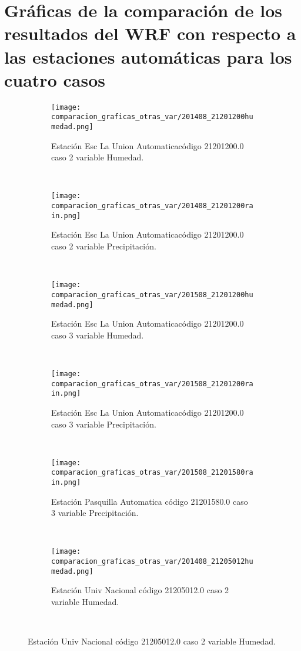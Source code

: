 \chapter{Gráficas de la comparación de los resultados del WRF con respecto a las estaciones automáticas para los cuatro casos}



\label{anexo:graficas_otras_variables_wrf}


\begin{figure}
    
\begin{subfigure}[normla]{0.4\textwidth}
\caption{Estación Esc La Union Automaticacódigo 21201200.0 caso 2 variable Humedad.}
\texttt{[image: comparacion\_graficas\_otras\_var/201408\_21201200humedad.png]}
\end{subfigure}
~
\begin{subfigure}[normla]{0.4\textwidth}
\caption{Estación Esc La Union Automaticacódigo 21201200.0 caso 2 variable Precipitación.}
\texttt{[image: comparacion\_graficas\_otras\_var/201408\_21201200rain.png]}
\end{subfigure}
~
\begin{subfigure}[normla]{0.4\textwidth}
\caption{Estación Esc La Union Automaticacódigo 21201200.0 caso 3 variable Humedad.}
\texttt{[image: comparacion\_graficas\_otras\_var/201508\_21201200humedad.png]}
\end{subfigure}
~
\begin{subfigure}[normla]{0.4\textwidth}
\caption{Estación Esc La Union Automaticacódigo 21201200.0 caso 3 variable Precipitación.}
\texttt{[image: comparacion\_graficas\_otras\_var/201508\_21201200rain.png]}
\end{subfigure}
~
\begin{subfigure}[normla]{0.4\textwidth}
\caption{Estación Pasquilla Automatica código 21201580.0 caso 3 variable Precipitación.}
\texttt{[image: comparacion\_graficas\_otras\_var/201508\_21201580rain.png]}
\end{subfigure}
~
\begin{subfigure}[normla]{0.4\textwidth}
\caption{Estación Univ Nacional código 21205012.0 caso 2 variable Humedad.}
\texttt{[image: comparacion\_graficas\_otras\_var/201408\_21205012humedad.png]}
\end{subfigure}
~
\end{figure}
           
